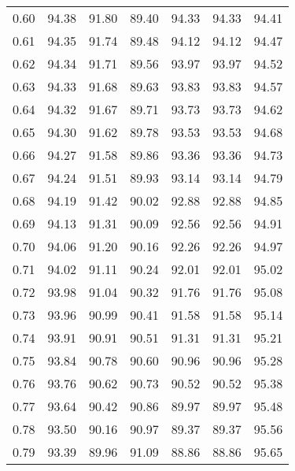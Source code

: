 \begin{tabular}{|c|c|c|c|c|c|c|}
      0.60 &     94.38 &     91.80 &      89.40 &   94.33 &      94.33 &         94.41 \\
      0.61 &     94.35 &     91.74 &      89.48 &   94.12 &      94.12 &         94.47 \\
      0.62 &     94.34 &     91.71 &      89.56 &   93.97 &      93.97 &         94.52 \\
      0.63 &     94.33 &     91.68 &      89.63 &   93.83 &      93.83 &         94.57 \\
      0.64 &     94.32 &     91.67 &      89.71 &   93.73 &      93.73 &         94.62 \\
      0.65 &     94.30 &     91.62 &      89.78 &   93.53 &      93.53 &         94.68 \\
      0.66 &     94.27 &     91.58 &      89.86 &   93.36 &      93.36 &         94.73 \\
      0.67 &     94.24 &     91.51 &      89.93 &   93.14 &      93.14 &         94.79 \\
      0.68 &     94.19 &     91.42 &      90.02 &   92.88 &      92.88 &         94.85 \\
      0.69 &     94.13 &     91.31 &      90.09 &   92.56 &      92.56 &         94.91 \\
      0.70 &     94.06 &     91.20 &      90.16 &   92.26 &      92.26 &         94.97 \\
      0.71 &     94.02 &     91.11 &      90.24 &   92.01 &      92.01 &         95.02 \\
      0.72 &     93.98 &     91.04 &      90.32 &   91.76 &      91.76 &         95.08 \\
      0.73 &     93.96 &     90.99 &      90.41 &   91.58 &      91.58 &         95.14 \\
      0.74 &     93.91 &     90.91 &      90.51 &   91.31 &      91.31 &         95.21 \\
      0.75 &     93.84 &     90.78 &      90.60 &   90.96 &      90.96 &         95.28 \\
      0.76 &     93.76 &     90.62 &      90.73 &   90.52 &      90.52 &         95.38 \\
      0.77 &     93.64 &     90.42 &      90.86 &   89.97 &      89.97 &         95.48 \\
      0.78 &     93.50 &     90.16 &      90.97 &   89.37 &      89.37 &         95.56 \\
      0.79 &     93.39 &     89.96 &      91.09 &   88.86 &      88.86 &         95.65 \\

\end{tabular}
